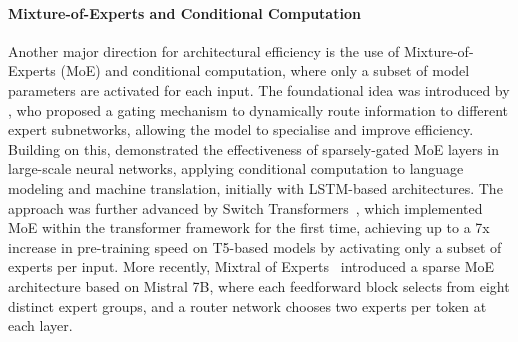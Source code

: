 \paragraph{Mixture-of-Experts and Conditional Computation}
Another major direction for architectural efficiency is the use of Mixture-of-Experts (MoE) and conditional computation, where only a subset of model parameters are activated for each input. The foundational idea was introduced by \citet{jacobs1991adaptive}, who proposed a gating mechanism to dynamically route information to different expert subnetworks, allowing the model to specialise and improve efficiency. Building on this, \citet{shazeer2017outrageously} demonstrated the effectiveness of sparsely-gated MoE layers in large-scale neural networks, applying conditional computation to language modeling and machine translation, initially with LSTM-based architectures. The approach was further advanced by Switch Transformers~\citep{fedus2021switch}, which implemented MoE within the transformer framework for the first time, achieving up to a 7x increase in pre-training speed on T5-based models by activating only a subset of experts per input. More recently, Mixtral of Experts~\citep{jiang2024mixtral} introduced a sparse MoE architecture based on Mistral 7B, where each feedforward block selects from eight distinct expert groups, and a router network chooses two experts per token at each layer. %

